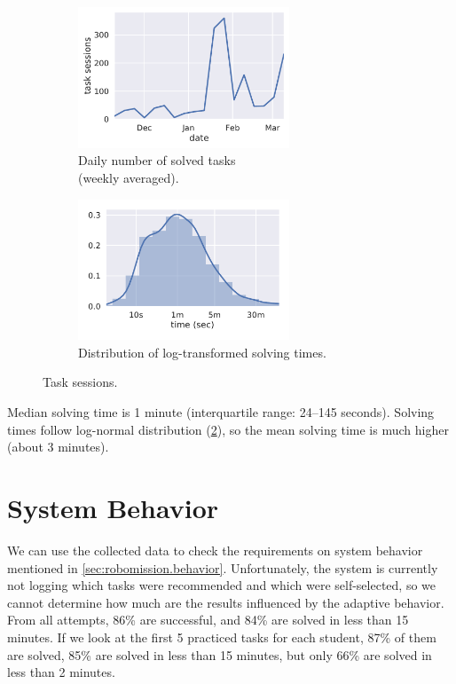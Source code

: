 \begin{figure}[htb]
\centering
\begin{subfigure}{.49\textwidth}
\centering
\includegraphics[height=42mm]{img/daily-task-sessions}
\caption{Daily number of solved tasks\\(weekly averaged).}
\label{fig:solved-count}
\end{subfigure}
\begin{subfigure}{.49\textwidth}
\centering
\includegraphics[height=42mm]{img/task-sessions-time-log}
\caption{Distribution of log-transformed solving times.}
\label{fig:solving-times-all}
\end{subfigure}
\caption{Task sessions.}
\label{fig:daily-task-sessions}
\end{figure}

Median solving time is 1 minute (interquartile range: 24--145 seconds).
Solving times follow log-normal distribution (\cref{fig:solving-times-all}),
so the mean solving time is much higher
(about 3 minutes). %


\section{System Behavior}

We can use the collected data to check the requirements on system behavior mentioned in
\cref{sec:robomission.behavior}. Unfortunately, the system is currently not logging
which tasks were recommended and which were self-selected, so we cannot determine
how much are the results influenced by the adaptive behavior. %
From all attempts, 86\% are successful, and 84\% are solved in less than 15 minutes.
If we look at the first 5 practiced tasks for each student, 87\% of them are solved,
85\% are solved in less than 15 minutes, but only 66\% are solved in less than 2 minutes.

